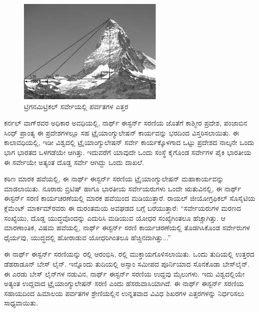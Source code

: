 \begin{figure}[!htbp]
\includegraphics{"images/image018.jpg"}
\caption{ಟ್ರಿಗನಮಿಟ್ರಿಕಲ್​ ಸರ್ವೇಯಲ್ಲಿ ಪರ್ವತಗಳ ಎತ್ತರ}\label{art14-fig1}
\end{figure}

ಕರ್ನಲ್​ ವಾಗ್​ರವರ ಅಧಿಕಾರ ಅವಧಿಯಲ್ಲಿ, ನಾರ್ಥ್ ಈಸ್ಟರ್ನ್ ಸರಣಿಯ ಜೊತೆಗೆ ಕಾಶ್ಮೀರ ಪ್ರದೇಶ, ಪಂಜಾಬಿನ ಸಿಂಧ್​ ಪ್ರಾಂತ್ಯ ಈ ಪ್ರದೇಶಗಳಲ್ಲೂ ಸಹ ಟ್ರೈಯಾಂಗ್ಯುಲೇಷನ್​ ಕಾರ್ಯವನ್ನು ಭರದಿಂದ ವಿಸ್ತರಿಸಲಾಯಿತು. ಈ ಕಾಲಾವಧಿಯಲ್ಲಿ, ಇಡೀ ವಿಶ್ವದಲ್ಲಿ ಟ್ರೈಯಾಂಗ್ಯುಲೇಷನ್​ ಸರ್ವೇ ಕಾರ್ಯಕ್ಕೊಳಗಾದ ಒಟ್ಟು ಪ್ರದೇಶದ ನಾಲ್ಕನೇ ಒಂದು ಭಾಗ ಭಾರತದ ಒಳಗಡೆಯೇ ಆಗಿತ್ತು. ಇದುವರೆಗೆ ಯಾವುದೇ ಒಂದು ಸಂಸ್ಥೆ ಕೈಗೊಂಡ ಸರ್ವೇಗಳ ಪೈಕಿ ಭಾರತೀಯ ಈ ಸರ್ವೇಯೇ ಅತ್ಯಂತ ದೊಡ್ಡ ಸರ್ವೇ ಆಗಿದ್ದು ಒಂದು ದಾಖಲೆ.

\vskip 4pt

ಕಠಿಣ ಮಾರಕ ಹವೆಯಲ್ಲಿ, ಈ ನಾರ್ಥ್ ಈಸ್ಟರ್ನ್ ಸರಣಿಯ ಟ್ರೈಯಾಂಗ್ಯುಲೇಷನ್​ ಮಹಾಕಾರ್ಯವನ್ನು ಮಾಡಲಾಯಿತು. ನೂರಾರು ಬ್ರಿಟಿಷ್​ ಹಾಗೂ ಭಾರತೀಯ ಸರ್ವೇಯರುಗಳು ಒಂದೇ ಋತುವಿನಲ್ಲಿ, ಈ ನಾರ್ಥ್ ಈಸ್ಟರ್ನ್ ಸರಣಿ ಕಾರ್ಯಚರಣೆಯಲ್ಲಿ ಮಾರಕ ಹವೆಯಿಂದ ಮಡಿಯುತ್ತಾರೆ. ರಾಯಲ್​ ಜೀಯೋಗ್ರಫಿಕಲ್​ ಸೊಸೈಟಿಯ ಕ್ಲೆಮೆಂಟ್​ ಮಾರ್ಕಮ್‌ರವರು ಈ ದುರಂತಮಯ ಅವಘಡದ ಬಗ್ಗೆ ಬರೆಯುತ್ತಾರೆ: “ಸರ್ವೇಯರುಗಳ ಮರಣದ ಸಂಖ್ಯೆಯು, ದೊಡ್ಡ ಯುದ್ಧವೊಂದನ್ನು ಎದುರಿಸಿ ಮಡಿಯುವ ಯೋಧರ ಸಂಖ್ಯೆಗಿಂತಲೂ ಹೆಚ್ಚಾಗಿತ್ತು. ಆ ಮಾರಣಾಂತಿಕ, ವಿಷಮ ಹವೆಯಲ್ಲಿ, ನಾರ್ಥ್ ಈಸ್ಟರ್ನ್ ಸರಣಿ ಕಾರ್ಯಚರಣೆಯಲ್ಲಿ ತೊಡಗಿಸಿಕೊಂಡ ಸರ್ವೇರುಗಳ ಧೈರ್ಯವು, ಯುದ್ಧದಲ್ಲಿ ಹೋರಾಡುವ ಯೋಧರಿಗಿಂತಲೂ ಹೆಚ್ಚಿನದಾಗಿತ್ತು...”

\newpage

ಈ ನಾರ್ಥ್ ಈಸ್ಟರ್ನ್ ಸರಣಿಯನ್ನು  ರಲ್ಲಿ ಆರಂಭಿಸಿ,  ರಲ್ಲಿ ಮುಕ್ತಾಯಗೊಳಿಸಲಾಯಿತು. ಒಂದು ತುದಿಯಲ್ಲಿ ಉತ್ತರದ ಡೆಹರಾಡೂನ್​ ಬೇಸ್​ ಲೈನ್​. ಇನ್ನೊಂದು ತುದಿಯಲ್ಲಿ ಅಸ್ಸಾಂ ಸಮೀಪದ ಪೂರ್ನಿಯಾದ ಸೊನಕೊಡಾ ಬೇಸ್​ ಲೈನ್​. ಈ ಎರಡು ಬೇಸ್​ ಲೈನ್​ಗಳ ನಡುವಿನ, ನಾರ್ಥ್ ಈಸ್ಟರ್ನ್ ಸರಣಿಯ ಉದ್ದವು  ಮೈಲುಗಳು. ಇದು ವಿಶ್ವದಲ್ಲಿಯೇ ಅತ್ಯಂತ ಉದ್ದವಾದ ಟ್ರೈಯಾಂಗ್ಯುಲೇಷನ್​ ಸರಣಿ ಎಂದು ಹೆಸರುವಾಸಿಯಾಗಿದೆ. ಈ ನಾರ್ಥ್ ಈಸ್ಟರ್ನ್ ಸರಣಿಯ ಸಹಾಯದಿಂದ ಹಿಮಾಲಯ ಪರ್ವತಗಳ ಶ್ರೇಣಿಯಲ್ಲಿನ ಉನ್ನತವಾದ  ವಿವಿಧ ಶಿಖರಗಳ ಎತ್ತರಗಳನ್ನು ನಿರ್ಧರಿಸಲು ಸಾಧ್ಯವಾಯಿತು.


